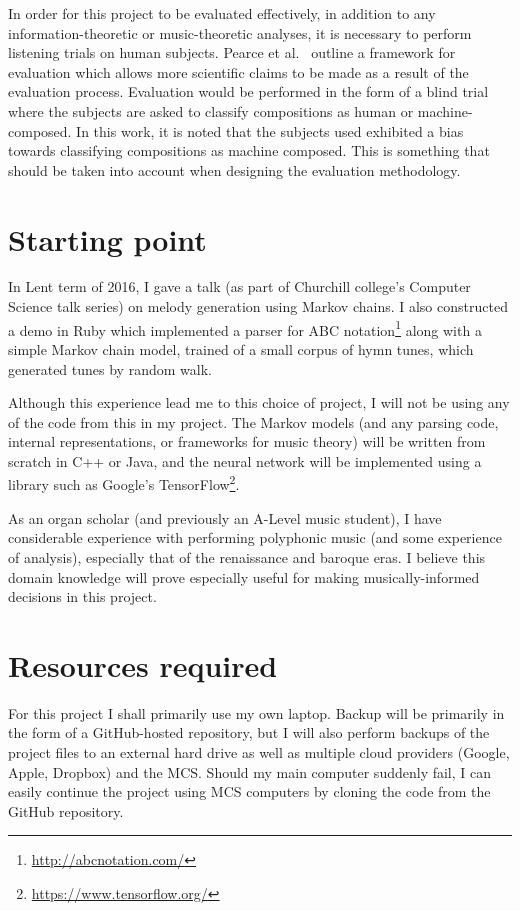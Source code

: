 \documentclass[12pt,a4paper,twoside]{article}
\begin{document}
In order for this project to be evaluated effectively, in addition to any information-theoretic or music-theoretic analyses, it is necessary to perform listening trials on human subjects. Pearce et al.\ \cite{pearce2001evaluation} outline a framework for evaluation which allows more scientific claims to be made as a result of the evaluation process. Evaluation would be performed in the form of a blind trial where the subjects are asked to classify compositions as human or machine-composed. In this work, it is noted that the subjects used exhibited a bias towards classifying compositions as machine composed. This is something that should be taken into account when designing the evaluation methodology.

\section*{Starting point}

In Lent term of 2016, I gave a talk (as part of Churchill college's Computer Science talk series) on melody generation using Markov chains. I also constructed a demo in Ruby which implemented a parser for ABC notation\footnote{\url{http://abcnotation.com/}} along with a simple Markov chain model, trained of a small corpus of hymn tunes, which generated tunes by random walk. 

Although this experience lead me to this choice of project, I will not be using any of the code from this in my project. The Markov models (and any parsing code, internal representations, or frameworks for music theory) will be written from scratch in C++ or Java, and the neural network will be implemented using a library such as Google's TensorFlow\footnote{\url{https://www.tensorflow.org/}}.

As an organ scholar (and previously an A-Level music student), I have considerable experience with performing polyphonic music (and some experience of analysis), especially that of the renaissance and baroque eras. I believe this domain knowledge will prove especially useful for making musically-informed decisions in this project. 

\section*{Resources required}

For this project I shall primarily use my own laptop. Backup will be primarily in the form of a GitHub-hosted repository, but I will also perform backups of the project files to an external hard drive as well as multiple cloud providers (Google, Apple, Dropbox) and the MCS. Should my main computer suddenly fail, I can easily continue the project using MCS computers by cloning the code from the GitHub repository.
\end{document}
